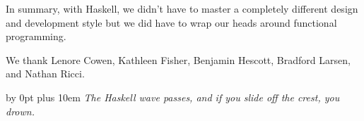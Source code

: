 \documentclass[preprint,nonatbib,blockstyle,nocopyrightspace,times]{sigplanconf}
\begin{document}
In summary, with Haskell, we didn't have to master a completely different 
design and development style but we did have to wrap our heads around 
functional programming.


%  
%  
%  

% 

\acks

We thank Lenore Cowen, Kathleen Fisher, Benjamin Hescott, Bradford Larsen, and Nathan Ricci.








\vfill

\begingroup
\advance\leftskip by 0pt plus 10em
\emph{The Haskell wave passes, and if you slide off the crest, you
drown.}
\endgroup
\end{document}

